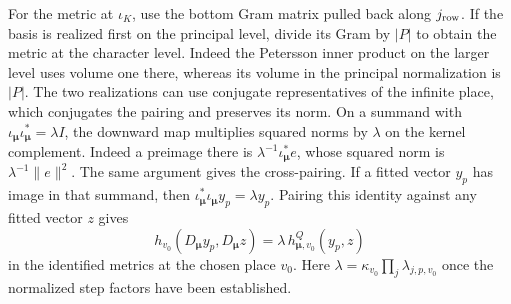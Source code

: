 For the metric at
\(\iota_K\), use the bottom Gram matrix pulled back along
\(j_{\rm row}\). If the basis is realized first on the principal
level, divide its Gram by \(|P|\) to obtain the metric at
the character level. Indeed the Petersson inner product on the
larger level uses volume one there, whereas its volume in the
principal normalization is \(|P|\). The two realizations can
use conjugate representatives of the infinite place, which
conjugates the pairing and preserves its norm. On a summand with
\(\iota_{\boldsymbol\mu}\iota_{\boldsymbol\mu}^*=\lambda I\),
the downward map multiplies squared norms by \(\lambda\) on
the kernel complement. Indeed a preimage there is
\(\lambda^{-1}\iota_{\boldsymbol\mu}^*e\), whose squared norm
is \(\lambda^{-1}\|e\|^2\).
The same argument gives the cross-pairing. If a fitted vector
\(y_p\) has image in that summand, then
\(\iota_{\boldsymbol\mu}^*\iota_{\boldsymbol\mu}y_p=\lambda y_p\).
Pairing this identity against any fitted vector \(z\) gives
\[
 h_{v_0}(D_{\boldsymbol\mu}y_p,D_{\boldsymbol\mu}z)
      =\lambda\,h^Q_{\boldsymbol\mu,v_0}(y_p,z)
\]
in the identified metrics at the chosen place \(v_0\).
Here \(\lambda=\kappa_{v_0}\prod_j\lambda_{j,p,v_0}\)
once the normalized step factors have been established.

